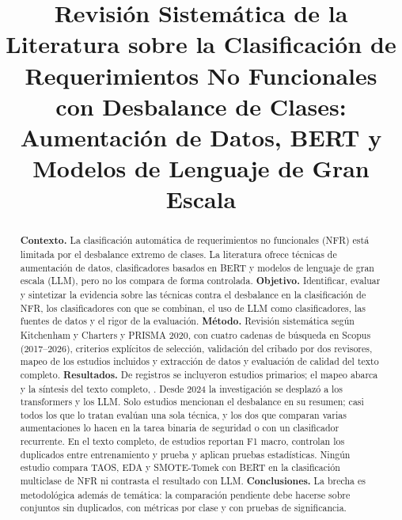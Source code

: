 \documentclass[conference]{IEEEtran}
\begin{document}
\title{Revisión Sistemática de la Literatura sobre la Clasificación de Requerimientos No Funcionales con Desbalance de Clases: Aumentación de Datos, BERT y Modelos de Lenguaje de Gran Escala}

\author{%
}

\maketitle

\begin{abstract}
\textbf{Contexto.} La clasificación automática de requerimientos no funcionales (NFR) está limitada por el desbalance extremo de clases. La literatura ofrece técnicas de aumentación de datos, clasificadores basados en BERT y modelos de lenguaje de gran escala (LLM), pero no los compara de forma controlada. \textbf{Objetivo.} Identificar, evaluar y sintetizar la evidencia sobre las técnicas contra el desbalance en la clasificación de NFR, los clasificadores con que se combinan, el uso de LLM como clasificadores, las fuentes de datos y el rigor de la evaluación. \textbf{Método.} Revisión sistemática según Kitchenham y Charters y PRISMA 2020, con cuatro cadenas de búsqueda en Scopus (2017--2026), criterios explícitos de selección, validación del cribado por dos revisores, mapeo de los estudios incluidos y extracción de datos y evaluación de calidad del texto completo. \textbf{Resultados.} De \nIdent{} registros se incluyeron \nBuscados{} estudios primarios; el mapeo abarca \nMapeo{} y la síntesis del texto completo, \nSintesis. Desde 2024 la investigación se desplazó a los transformers y los LLM. Solo \nMapeoDesbalance{} estudios mencionan el desbalance en su resumen; casi todos los que lo tratan evalúan una sola técnica, y los dos que comparan varias aumentaciones lo hacen en la tarea binaria de seguridad o con un clasificador recurrente. En el texto completo, \nMacro{} de \nSintesis{} estudios reportan F1 macro, \nDupSi{} controlan los duplicados entre entrenamiento y prueba y \nEstad{} aplican pruebas estadísticas. Ningún estudio compara TAOS, EDA y SMOTE-Tomek con BERT en la clasificación multiclase de NFR ni contrasta el resultado con LLM. \textbf{Conclusiones.} La brecha es metodológica además de temática: la comparación pendiente debe hacerse sobre conjuntos sin duplicados, con métricas por clase y con pruebas de significancia.
\end{abstract}
\end{document}
